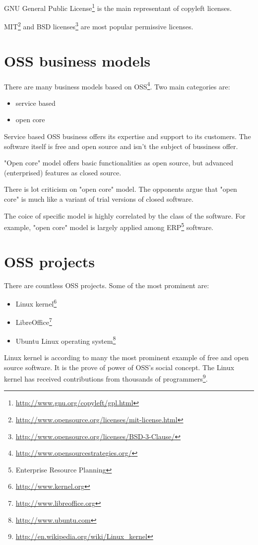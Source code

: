 \documentclass[times, utf8, seminar]{fit}
\begin{document}
GNU General Public License\footnote{\url{http://www.gnu.org/copyleft/gpl.html}} is the main representant of copyleft licenses.

MIT\footnote{\url{http://www.opensource.org/licenses/mit-license.html}} and BSD licenses\footnote{\url{http://www.opensource.org/licenses/BSD-3-Clause/}} are most popular permissive licenses.

\section{OSS business models}

There are many business models based on OSS\footnote{\url{http://www.opensourcestrategies.org/}}. Two main categories are: 
\begin{itemize}
  \item service based
  \item open core 
\end{itemize}


Service based OSS business offers its expertise and support to its customers. The software itself is free and open source and isn't the subject of bussiness offer.

"Open core" model offers basic functionalities as open source, but advanced (enterprised) features as closed source.

There is lot criticism on "open core" model. The opponents argue that "open core" is much like a variant of trial versions of closed software.

The coice of specific model is highly correlated by the class of the software.  For example, "open core" model is largely applied among ERP\footnote{Enterprise Resource Planning} software.  

\section{OSS projects}

There are countless OSS projects. Some of the most prominent are:  
\begin{itemize}
  \item Linux kernel\footnote{\url{http://www.kernel.org}}
  \item LibreOffice\footnote{\url{http://www.libreoffice.org}}
  \item Ubuntu Linux operating system\footnote{\url{http://www.ubuntu.com}}
\end{itemize}

Linux kernel is according to many the most prominent example of free and open source software. It is the prove of power of OSS's social concept. The Linux kernel has received contributions from thousands of programmers\footnote{\url{http://en.wikipedia.org/wiki/Linux_kernel}}.
\end{document}
